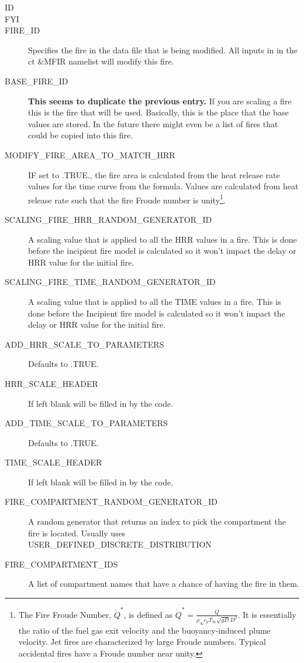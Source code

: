 \documentclass[12pt,twoside]{book}
\begin{document}
\begin{description}
  \item[ID]
  \item[FYI]
  \item[FIRE\_ID] Specifies the fire in the data file that is being modified. All inputs in in the {ct \&MFIR} namelist will modify this fire.
  \item[BASE\_FIRE\_ID] \textbf{This seems to duplicate the previous entry.} If you are scaling a fire this is the fire that will be used. Basically, this is the place that the base values are stored. In the future there might even be a list of fires that could be copied into this fire.\
  \item[MODIFY\_FIRE\_AREA\_TO\_MATCH\_HRR] IF set to {\ct .TRUE.}, the fire area is calculated from the heat release rate values for the time curve from the formula. Values are calculated from heat release rate such that the fire Froude number is unity\footnote{The Fire Froude Number, $\dot{Q}^*$, is defined as $\dot{Q}^* = \frac{\dot{Q}}{\rho_\infty c_p T_\infty \sqrt{gD} D^2}$. It is essentially the ratio of the fuel gas exit velocity and the buoyancy-induced plume velocity. Jet fires are characterized by large Froude numbers. Typical accidental fires have a Froude number near unity.}.
  \item[SCALING\_FIRE\_HRR\_RANDOM\_GENERATOR\_ID] A scaling value that is applied to all the HRR values in a fire. This is done before the incipient fire model is calculated so it won’t impact the delay or HRR value for the initial fire.
  \item[SCALING\_FIRE\_TIME\_RANDOM\_GENERATOR\_ID] A scaling value that is applied to all the TIME values in a fire. This is done before the Incipient fire model is calculated so it won’t impact the delay or HRR value for the initial fire.
  \item[ADD\_HRR\_SCALE\_TO\_PARAMETERS] Defaults to {\ct .TRUE.}
  \item[HRR\_SCALE\_HEADER] If left blank will be filled in by the code.
  \item[ADD\_TIME\_SCALE\_TO\_PARAMETERS] Defaults to {\ct .TRUE.}
  \item[TIME\_SCALE\_HEADER] If left blank will be filled in by the code.
  \item[FIRE\_COMPARTMENT\_RANDOM\_GENERATOR\_ID] A random generator that returns an index to pick the compartment the fire is located. Usually uses {\ct USER\_DEFINED\_DISCRETE\_DISTRIBUTION}
  \item[FIRE\_COMPARTMENT\_IDS] A list of compartment names that have a chance of having the fire in them.

\end{description}
\end{document}
